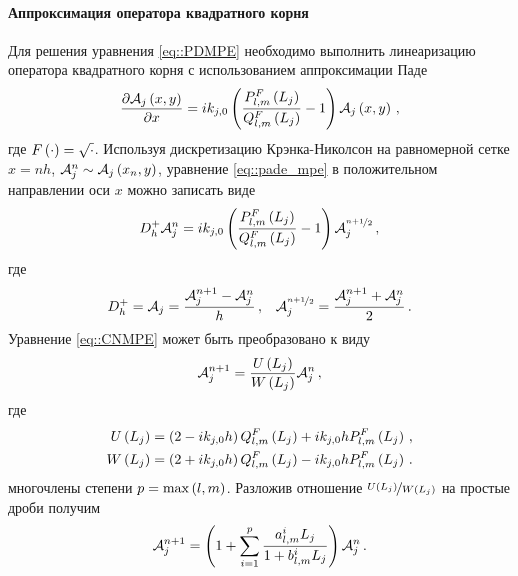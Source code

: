 \documentclass[../document.tex]{subfiles}
\begin{document}
            \paragraph{Аппроксимация оператора квадратного корня}
                \par Для решения уравнения \eqref{eq::PDMPE} необходимо выполнить линеаризацию оператора квадратного корня с использованием аппроксимации Паде
                \begin{equation}\label{eq::pade_mpe}
                    \frac{\partial\mathcal{A}_j\left(x,y\right)}{\partial x}=ik_{j,0}\left(\frac{P_{l,m}^F\left(L_j\right)}{Q_{l,m}^F\left(L_j\right)}-1\right)\mathcal{A}_j\left(x,y\right)\,,
                \end{equation}
                где $F\left(\cdot\right)=\sqrt{\cdot}$. Используя дискретизацию Крэнка-Николсон \cite{crank} на равномерной сетке $x=nh$, $\mathcal{A}_j^n\sim\mathcal{A}_j\left(x_n,y\right)$, уравнение \eqref{eq::pade_mpe} в положительном направлении оси $x$ можно записать виде
                \begin{equation}\label{eq::CNMPE}
                    D_h^+\mathcal{A}_j^n=ik_{j,0}\left(\frac{P_{l,m}^F\left(L_j\right)}{Q_{l,m}^F\left(L_j\right)}-1\right)\mathcal{A}_j^{\nicefrac{n+1}{2}}\,,
                \end{equation}
                где 
                \begin{align*}
                    D_h^+=\mathcal{A}_j=\frac{\mathcal{A}_j^{n+1}-\mathcal{A}_j^n}{h}\,,&&\mathcal{A}_j^{\nicefrac{n+1}{2}}=\frac{\mathcal{A}_j^{n+1}+\mathcal{A}_j^n}{2}\,.
                \end{align*}
                Уравнение \eqref{eq::CNMPE} может быть преобразовано к виду
                \begin{equation}
                    \mathcal{A}_j^{n+1}=\frac{U\left(L_j\right)}{W\left(L_j\right)}\mathcal{A}_j^n\,,
                \end{equation}
                где
                \begin{align*}
                    U\left(L_j\right)&=\left(2-ik_{j,0}h\right)Q_{l,m}^F\left(L_j\right)+ik_{j,0}hP_{l,m}^F\left(L_j\right)\,,\\
                    W\left(L_j\right)&=\left(2+ik_{j,0}h\right)Q_{l,m}^F\left(L_j\right)-ik_{j,0}hP_{l,m}^F\left(L_j\right)\,.
                \end{align*}
                многочлены степени $p=\max\left(l,m\right)$. Разложив отношение $\nicefrac{U\left(L_j\right)}{W\left(L_j\right)}$ на простые дроби получим
                \begin{equation}\label{eq::dPDMPE}
                    \mathcal{A}_j^{n+1}=\left(1+\sum\limits_{i=1}^p\frac{a_{l,m}^iL_j}{1+b_{l,m}^iL_j}\right)\mathcal{A}_j^n\,.
                \end{equation}
\end{document}
